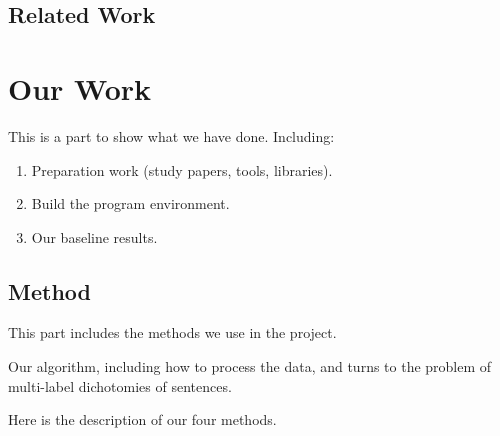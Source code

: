 \documentclass[12pt,twocolumn,letterpaper]{article}
\begin{document}
\subsection{Related Work}

\section{Our Work}

This is a part to show what we have done. Including:
\begin{enumerate}
\item Preparation work (study papers, tools, libraries).

\item Build the program environment.

\item Our baseline results.
\end{enumerate}

\subsection{Method}

This part includes the methods we use in the project. 

Our algorithm, including how to process the data, and turns to the problem of multi-label dichotomies of sentences.

Here is the description of our four methods.
\end{document}
